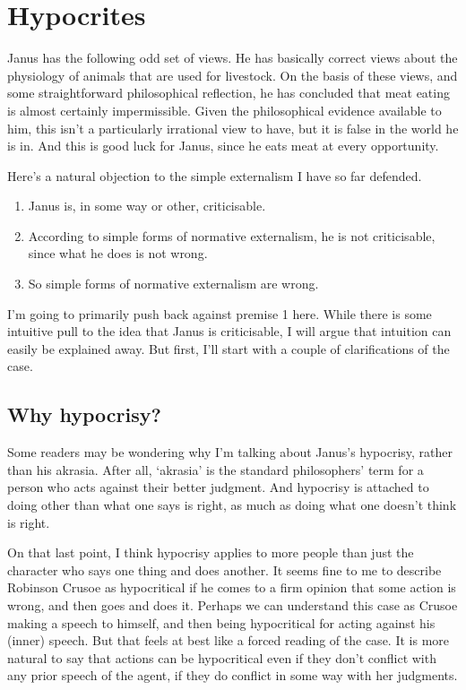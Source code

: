 \section{Hypocrites}
\label{hypocrites}

\gls{Janus} has the following odd set of views. He has basically correct views about the physiology of animals that are used for livestock. On the basis of these views, and some straightforward philosophical reflection, he has concluded that meat eating is almost certainly impermissible. Given the philosophical evidence available to him, this isn't a particularly irrational view to have, but it is false in the world he is in. And this is good luck for \gls{Janus}, since he eats meat at every opportunity.

Here's a natural objection to the simple externalism I have so far defended.

\begin{enumerate}
\item{} \gls{Janus} is, in some way or other, criticisable.

\item{} According to simple forms of normative externalism, he is not criticisable, since what he does is not wrong.

\item{} So simple forms of normative externalism are wrong.

\end{enumerate}
I'm going to primarily push back against premise 1 here. While there is some intuitive pull to the idea that \gls{Janus} is criticisable, I will argue that intuition can easily be explained away. But first, I'll start with a couple of clarifications of the case.

\subsection{Why hypocrisy?}
\label{whyhypocrisy}

Some readers may be wondering why I'm talking about \gls{Janus}'s hypocrisy, rather than his akrasia. After all, `akrasia' is the standard philosophers' term for a person who acts against their better judgment. And hypocrisy is attached to doing other than what one says is right, as much as doing what one doesn't think is right.

On that last point, I think hypocrisy applies to more people than just the character who says one thing and does another. It seems fine to me to describe Robinson Crusoe as hypocritical if he comes to a firm opinion that some action is wrong, and then goes and does it. Perhaps we can understand this case as Crusoe making a speech to himself, and then being hypocritical for acting against his (inner) speech. But that feels at best like a forced reading of the case. It is more natural to say that actions can be hypocritical even if they don't conflict with any prior speech of the agent, if they do conflict in some way with her judgments.

